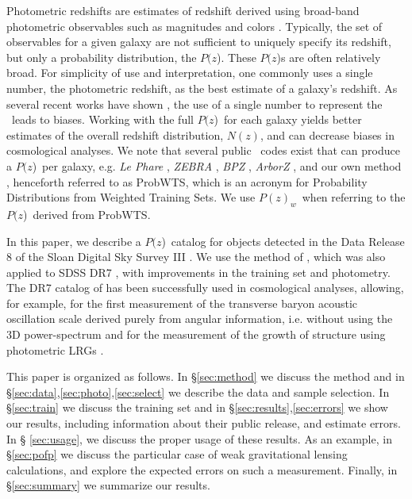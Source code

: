\documentclass[12pt,preprint]{aastex}
\newcommand{\pofz}{$P(z$)}
\newcommand{\pofzw}{$P(z)_w$\ }
\newcommand{\acronym}{ProbWTS}
\begin{document}
Photometric redshifts are estimates of redshift derived using broad-band
photometric observables such as magnitudes and colors \citep{bau62,pus82,koo85,loh86,con95}. 
Typically, the set of observables for a given galaxy are not sufficient to uniquely specify its
redshift, but only a probability distribution, the \pofz.  These \pofz s are
often relatively broad. For simplicity of use and interpretation, one commonly
uses a single number, the photometric redshift, as the best estimate of a
galaxy's redshift.  As several recent works have shown
\citep{man08,CunhaPhotoz09,wit09,bor10,abr11}, the use of a single number to
represent the \photoz\ leads to biases.  Working with the full \pofz\ for each
galaxy yields better estimates of the overall redshift distribution, $N(z)$,
and can decrease biases in cosmological analyses.  We note that several public
\photoz\ codes exist that can produce a \pofz\ per galaxy, e.g.  {\it Le Phare}
\citep{arn99,ilb06}, {\it ZEBRA} \citep{fel06}, {\it BPZ} \citep{coe06}, {\it
ArborZ} \citep{ger10}, and our own method \citep{CunhaPhotoz09}, henceforth
referred to as \acronym, which is an acronym for Probability Distributions from
Weighted Training Sets.  We use \pofzw when referring to the \pofz\  derived from
\acronym.



In this paper, we describe a \pofz\ catalog for objects detected in the Data
Release 8 \citep[SDSS DR8;][]{dr8} of the Sloan Digital Sky Survey III
\citep[SDSS III;][]{Eisenstein2011}.  We use the method of
\citet{CunhaPhotoz09}, which was also applied to SDSS DR7 \citep{dr7}, with
improvements in the training set and photometry.  The DR7 catalog of
\cite{CunhaPhotoz09} has been successfully used in cosmological analyses,
allowing, for example, for the first measurement of the transverse baryon
acoustic oscillation scale derived purely from angular information, i.e.
without using the 3D power-spectrum \citep{car11}  and for the measurement of
the growth of structure using photometric LRGs \citep{cro11}. 

This paper is organized as follows.  In \S \ref{sec:method} we discuss the
method and in \S \ref{sec:data},\ref{sec:photo},\ref{sec:select} we describe
the data and sample selection. In \S \ref{sec:train} we discuss the training
set and in \S \ref{sec:results},\ref{sec:errors} we show our results, including
information about their public release, and estimate errors.  In \S
\ref{sec:usage}, we discuss the proper usage of these results. As an example,
in \S \ref{sec:pofp} we discuss the particular case of weak gravitational
lensing calculations, and explore the expected errors on such a measurement.
Finally, in \S \ref{sec:summary} we summarize our results.
\end{document}
